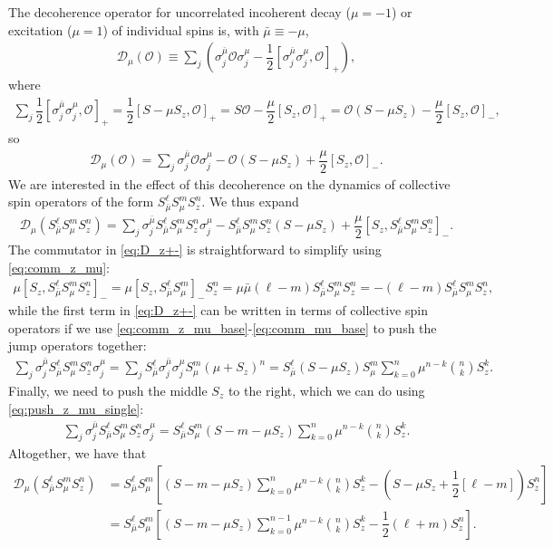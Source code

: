 \documentclass[aps,notitlepage,nofootinbib,11pt]{revtex4-1}
\newcommand{\f}[2]{\dfrac{#1}{#2}} %
\newcommand{\p}[1]{\left(#1\right)} %
\renewcommand{\sp}[1]{\left[#1\right]} %
\newcommand{\D}{\mathcal{D}}
\renewcommand{\O}{\mathcal{O}}
\newcommand{\bmu}{{\bar\mu}}
\newcommand{\1}{\mathds{1}}
\begin{document}
The decoherence operator for uncorrelated incoherent decay ($\mu=-1$)
or excitation ($\mu=1$) of individual spins is, with $\bmu\equiv-\mu$,
\begin{align}
  \D_\mu\p{\O}
  \equiv \sum_j\p{\sigma_j^\bmu \O \sigma_j^\mu
    - \f12\sp{\sigma_j^\bmu \sigma_j^\mu,\O}_+},
\end{align}
where
\begin{align}
  \sum_j \f12\sp{\sigma_j^\bmu \sigma_j^\mu,\O}_+
  = \f12\sp{S-\mu S_z,\O}_+
  = S\O - \f{\mu}{2}\sp{S_z,\O}_+
  = \O\p{S-\mu S_z} - \f{\mu}{2}\sp{S_z,\O}_-,
\end{align}
so
\begin{align}
  \D_\mu\p{\O}
  = \sum_j \sigma_j^\bmu \O \sigma_j^\mu
  - \O\p{S - \mu S_z} + \f{\mu}{2} \sp{S_z,\O}_-.
\end{align}
We are interested in the effect of this decoherence on the dynamics of
collective spin operators of the form $S_\bmu^\ell S_\mu^m S_z^n$.  We
thus expand
\begin{align}
  \D_\mu\p{S_\bmu^\ell S_\mu^m S_z^n}
  = \sum_j \sigma_j^\bmu S_\bmu^\ell S_\mu^m S_z^n \sigma_j^\mu
  - S_\bmu^\ell S_\mu^m S_z^n \p{S - \mu S_z}
  + \f{\mu}{2} \sp{S_z, S_\bmu^\ell S_\mu^m S_z^n}_-.
  \label{eq:D_z+-}
\end{align}
The commutator in \eqref{eq:D_z+-} is straightforward to simplify
using \eqref{eq:comm_z_mu}:
\begin{align}
  \mu \sp{S_z, S_\bmu^\ell S_\mu^m S_z^n}_-
  = \mu \sp{S_z, S_\bmu^\ell S_\mu^m}_- S_z^n
  = \mu\bmu \p{\ell-m} S_\bmu^\ell S_\mu^m S_z^n
  = - \p{\ell-m} S_\bmu^\ell S_\mu^m S_z^n,
\end{align}
while the first term in \eqref{eq:D_z+-} can be written in terms of
collective spin operators if we use
\eqref{eq:comm_z_mu_base}-\eqref{eq:comm_mu_base} to push the jump
operators together:
\begin{align}
  \sum_j \sigma_j^\bmu S_\bmu^\ell S_\mu^m S_z^n \sigma_j^\mu
  = \sum_j S_\bmu^\ell \sigma_j^\bmu \sigma_j^\mu S_\mu^m \p{\mu+S_z}^n
  = S_\bmu^\ell \p{S - \mu S_z} S_\mu^m
  \sum_{k=0}^n \mu^{n-k} { n \choose k } S_z^k.
\end{align}
Finally, we need to push the middle $S_z$ to the right, which we can
do using \eqref{eq:push_z_mu_single}:
\begin{align}
  \sum_j \sigma_j^\bmu S_\bmu^\ell S_\mu^m S_z^n \sigma_j^\mu
  = S_\bmu^\ell S_\mu^m \p{S - m - \mu S_z}
  \sum_{k=0}^n \mu^{n-k} { n \choose k } S_z^k.
\end{align}
Altogether, we have that
\begin{align}
  \D_\mu\p{S_\bmu^\ell S_\mu^m S_z^n}
  &= S_\bmu^\ell S_\mu^m \sp{\p{S - m - \mu S_z} \sum_{k=0}^n
    \mu^{n-k} { n \choose k } S_z^k
    - \p{S - \mu S_z + \f12\sp{\ell-m}} S_z^n} \\
  &= S_\bmu^\ell S_\mu^m \sp{\p{S - m - \mu S_z} \sum_{k=0}^{n-1}
    \mu^{n-k} { n \choose k } S_z^k - \f12 \p{\ell+m} S_z^n}.
\end{align}
\end{document}
